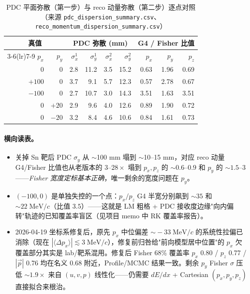 \documentclass[a4paper, 11pt]{article}
\begin{document}
\begin{table}[H]
\centering\footnotesize
\caption{PDC 平面弥散（第一步）与 reco 动量弥散（第二步）逐点对照（来源 \texttt{pdc\_dispersion\_summary.csv}、\texttt{reco\_momentum\_dispersion\_summary.csv}）}
\begin{tabular}{rr|rrrr|rrr}
\toprule
\multicolumn{2}{c}{真值} & \multicolumn{4}{c}{PDC 弥散 (mm)} & \multicolumn{3}{c}{G4 / Fisher 比值} \\
\cmidrule(lr){3-6}\cmidrule(lr){7-9}
$p_x$ & $p_y$ & $\sigma^{1}_x$ & $\sigma^{1}_y$ & $\sigma^{2}_x$ & $\sigma^{2}_y$ & $p_x$ & $p_y$ & $p_z$ \\
\midrule
$0$    & $0$   & 2.8 & 11.2 & 3.5 & 15.2 & 0.63 & 1.96 & 0.69 \\
$+100$ & $0$   & 3.7 &  9.1 & 5.7 & 12.3 & 0.57 & 2.78 & 0.67 \\
$-100$ & $0$   & 2.7 & 10.7 & 3.0 & 14.3 & 3.51 & 1.63 & 3.51 \\
$0$    & $+20$ & 2.9 &  9.6 & 4.0 & 12.6 & 0.89 & 1.90 & 0.72 \\
$0$    & $-20$ & 3.2 &  8.4 & 4.6 & 10.6 & 0.84 & 1.61 & 0.73 \\
\bottomrule
\end{tabular}
\end{table}

\paragraph{横向读表。}
\begin{itemize}[nosep]
  \item 关掉 Sn 靶后 PDC $\sigma_y$ 从 $\sim$100 mm 塌到 $\sim$10--15 mm，对应 reco 动量 G4/Fisher 比值也从老版本的 $3$--$28\times$ 塌到 $p_x,p_z$ 的 $\sim 0.6$--$0.9$ 和 $p_y$ 的 $\sim 1.5$--$3$——\emph{Fisher 宽度定标基本正确}，唯一剩余的宽度问题在 $p_y$。
  \item $(-100, 0)$ 是单独失控的一个点：$p_x / p_z$ G4 半宽分别飙到 $\sim 35$ 和 $\sim 22\;\mathrm{MeV}/c$（比值 $3.5$）——这就是 LM 粗格 + PDC 接收度边缘"向内偏转"轨迹的已知覆盖率盲区（见项目 memo 中 RK 覆盖率报告）。
  \item 2026-04-19 坐标系修复后，原先 $p_x$ 中位偏差 $\sim\!-33\;\mathrm{MeV}/c$ 的系统性拉偏已消除（现在 $|\langle\Delta p_x\rangle| \lesssim 3\;\mathrm{MeV}/c$），修复前归咎给"前向模型居中位置"的 $p_x$ 欠覆盖部分其实是 lab/靶系混用。修复后 Fisher 68\% 覆盖率 $p_x$ 0.80 / $p_z$ 0.77 / $|\vec p|$ 0.76 均在名义 0.68 附近，Profile/MCMC 结果一致。剩余 $p_y$ Fisher $\sigma$ 压低 $\sim 1.9\times$ 来自 $(u,v,p)$ 线性化——仍需要 $dE/dx$ + Cartesian $(p_x,p_y,p_z)$ 直接拟合来根治。
\end{itemize}
\end{document}
